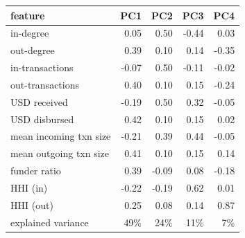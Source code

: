 \begin{tabular}{lrrrr}
\toprule
feature & PC1 & PC2 & PC3 & PC4\\
\midrule
in-degree & 0.05 & 0.50 & -0.44 & 0.03\\
out-degree & 0.39 & 0.10 & 0.14 & -0.35\\
in-transactions & -0.07 & 0.50 & -0.11 & -0.02\\
out-transactions & 0.40 & 0.10 & 0.15 & -0.24\\
USD received & -0.19 & 0.50 & 0.32 & -0.05\\
USD disbursed & 0.42 & 0.10 & 0.15 & 0.02\\
mean incoming txn size & -0.21 & 0.39 & 0.44 & -0.05\\
mean outgoing txn size & 0.41 & 0.10 & 0.15 & 0.14\\
funder ratio & 0.39 & -0.09 & 0.08 & -0.18\\
HHI (in) & -0.22 & -0.19 & 0.62 & 0.01\\
HHI (out) & 0.25 & 0.08 & 0.14 & 0.87\\
\midrule
explained variance & 49\% & 24\% & 11\% & 7\%\\
\bottomrule
\end{tabular}
